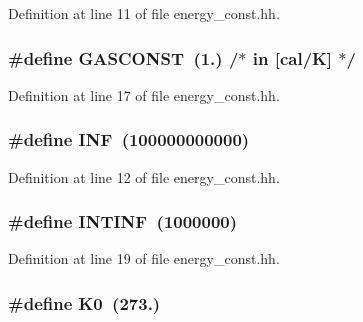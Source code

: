 Definition at line 11 of file energy\+\_\+const.\+hh.

\hypertarget{energy__const_8hh_ab1e4a8d82f24ed5db01dde5f25269cf1}{
\subsubsection[{G\+A\+S\+C\+O\+N\+S\+T}]{\setlength{\rightskip}{0pt plus 5cm}\#define G\+A\+S\+C\+O\+N\+S\+T~(1.)  /$\ast$ in \mbox{[}cal/K\mbox{]} $\ast$/}}\label{energy__const_8hh_ab1e4a8d82f24ed5db01dde5f25269cf1}


Definition at line 17 of file energy\+\_\+const.\+hh.

\hypertarget{energy__const_8hh_a12c2040f25d8e3a7b9e1c2024c618cb6}{
\subsubsection[{I\+N\+F}]{\setlength{\rightskip}{0pt plus 5cm}\#define I\+N\+F~(100000000000)}}\label{energy__const_8hh_a12c2040f25d8e3a7b9e1c2024c618cb6}


Definition at line 12 of file energy\+\_\+const.\+hh.

\hypertarget{energy__const_8hh_a0394650c03180f81bb6faa14a89201dc}{
\subsubsection[{I\+N\+T\+I\+N\+F}]{\setlength{\rightskip}{0pt plus 5cm}\#define I\+N\+T\+I\+N\+F~(1000000)}}\label{energy__const_8hh_a0394650c03180f81bb6faa14a89201dc}


Definition at line 19 of file energy\+\_\+const.\+hh.

\hypertarget{energy__const_8hh_a307c72605e3713972b4f4fb2d53ea20e}{
\subsubsection[{K0}]{\setlength{\rightskip}{0pt plus 5cm}\#define K0~(273.)}}\label{energy__const_8hh_a307c72605e3713972b4f4fb2d53ea20e}


